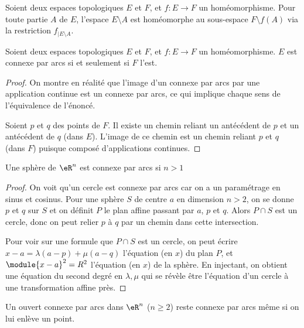 \begin{rem}Soient deux espaces topologiques $E$ et $F$, et $f : E\to F$ un homéomorphisme. Pour toute partie $A$ de $E$,
		l'espace $E\setminus A$ est homéomorphe au sous-espace $F\setminus f(A)$ via la restriction $f_{\vert E\setminus A}$.
\end{rem}

\begin{lemma}Soient deux espaces topologiques $E$ et $F$, et $f : E\to F$ un homéomorphisme. $E$ est connexe par arcs si et
	seulement si $F$ l'est.
\end{lemma}

\begin{proof}On montre en réalité que l'image d'un connexe par arcs
	par une application continue est un connexe par arcs, ce qui
	implique chaque sens de l'équivalence de l'énoncé.

	Soient $p$ et $q$ des points de $F$. Il existe un chemin reliant
	un antécédent de $p$ et un antécédent de $q$ (dans $E$). L'image
	de ce chemin est un chemin reliant $p$ et $q$ (dans $F$) puisque
	composé d'applications continues.
\end{proof}

\begin{lemma}
	Une sphère de $\eR^n$ est connexe par arcs si $n >1$
\end{lemma}

\begin{proof}On voit qu'un cercle est connexe par arcs car on a un
	paramétrage en sinus et cosinus. Pour une sphère $S$ de centre
	$a$ en dimension $n > 2$, on se donne $p$ et $q$ sur $S$ et on
	définit $P$ le plan affine passant par $a$, $p$ et $q$. Alors $P\cap S$ est un cercle, donc on peut relier $p$ à $q$ par un chemin
	dans cette intersection.

	Pour voir sur une formule que $P \cap S$ est un cercle, on peut
	écrire $x - a = \lambda(a-p) + \mu(a-q)$ l'équation (en $x$) du
	plan $P$, et $\module{x-a}^2 = R^2$ l'équation (en $x$) de la
	sphère. En injectant, on obtient une équation du second degré en
	$\lambda,\mu$ qui se révèle être l'équation d'un cercle à une
	transformation affine près.
\end{proof}

\begin{lemma}Un ouvert connexe par arcs dans $\eR^n$ ($n \geq 2$) reste
	connexe par arcs même si on lui enlève un point.
\end{lemma}

